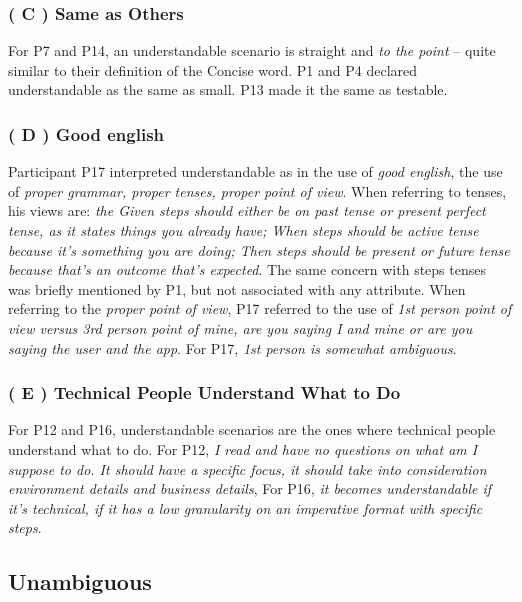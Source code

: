\subsubsection{\textbf{( C ) Same as Others}}
For P7 and P14, an understandable scenario is straight and \textit{to the point} -- quite similar to their definition of the Concise word. P1 and P4 declared understandable as the same as small. P13 made it the same as testable.

\subsubsection{\textbf{( D ) Good english}}
Participant P17 interpreted understandable as in the use of \textit{good english}, the use of \textit{proper grammar, proper tenses, proper point of view}. When referring to tenses, his views are: \textit{the Given steps should either be on past tense or present perfect tense, as it states things you already have; When steps should be active tense because it's something you are doing; Then steps should be present or future tense because that's an outcome that's expected}. The same concern with steps tenses was briefly mentioned by P1, but not associated with any attribute. When referring to the \textit{proper point of view}, P17 referred to the use of \textit{1st person point of view versus 3rd person point of mine, are you saying \textit{I} and \textit{mine} or are you saying \textit{the user} and \textit{the app}}. For P17, \textit{1st person is somewhat ambiguous}.

\subsubsection{\textbf{( E ) Technical People Understand What to Do}}
For P12 and P16, understandable scenarios are the ones where technical people understand what to do. For P12, \textit{I read and have no questions on what am I suppose to do. It should have a specific focus, it should take into consideration environment details and business details}, For P16, \textit{it becomes understandable if it's technical, if it has a low granularity on an imperative format with specific steps}.

\subsection{Unambiguous}

